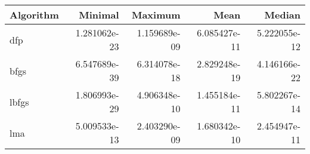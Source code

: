 \begin{tabular}{lrrrr}
\toprule
Algorithm &      Minimal &      Maximum &         Mean &       Median \\
\midrule
      dfp & 1.281062e-23 & 1.159689e-09 & 6.085427e-11 & 5.222055e-12 \\
     bfgs & 6.547689e-39 & 6.314078e-18 & 2.829248e-19 & 4.146166e-22 \\
    lbfgs & 1.806993e-29 & 4.906348e-10 & 1.455184e-11 & 5.802267e-14 \\
      lma & 5.009533e-13 & 2.403290e-09 & 1.680342e-10 & 2.454947e-11 \\
\bottomrule
\end{tabular}
